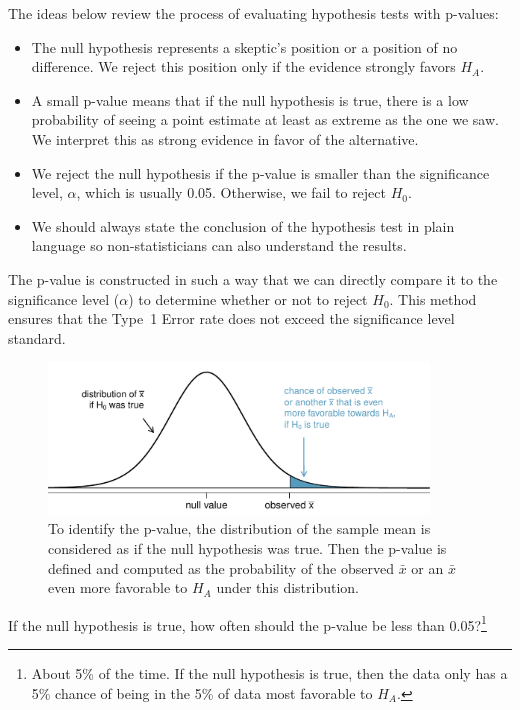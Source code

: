 The ideas below review the process of evaluating hypothesis tests with p-values:
\begin{itemize}
\setlength{\itemsep}{0mm}
\item The null hypothesis represents a skeptic's position or a position of no difference. We reject this position only if the evidence strongly favors $H_A$.
\item A small p-value means that if the null hypothesis is true, there is a low probability of seeing a point estimate at least as extreme as the one we saw. We interpret this as strong evidence in favor of the alternative.
\item We reject the null hypothesis if the p-value is smaller than the significance level, $\alpha$, which is usually 0.05. Otherwise, we fail to reject $H_0$.
\item We should always state the conclusion of the hypothesis test in plain language so non-statisticians can also understand the results.
\end{itemize}

The p-value is constructed in such a way that we can directly compare it to the significance level ($\alpha$) to determine whether or not to reject $H_0$. This method ensures that the Type~1 Error rate does not exceed the significance level standard. 

\begin{figure}[ht]
   \centering
   \includegraphics[width=0.9\textwidth]{04/figures/pValueOneSidedSleepStudyExplained/pValueOneSidedSleepStudyExplained}
   \caption{To identify the p-value, the distribution of the sample mean is considered as if the null hypothesis was true. Then the p-value is defined and computed as the probability of the observed $\bar{x}$ or an $\bar{x}$ even more favorable to $H_A$ under this distribution.}
   \label{pValueOneSidedSleepStudyExplained}
\end{figure}

\begin{exercise}
If the null hypothesis is true, how often should the p-value be less than 0.05?\footnote{About 5\% of the time. If the null hypothesis is true, then the data only has a 5\% chance of being in the 5\% of data most favorable to $H_A$.}
\end{exercise}

